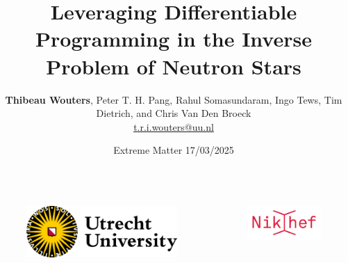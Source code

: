 \documentclass[usenames,dvipsnames,t]{beamer}
\title[\textsc{jester}] %
{Leveraging Differentiable Programming in the Inverse Problem of Neutron Stars}
\author[Thibeau Wouters]{\small{\textbf{Thibeau Wouters}, Peter T. H. Pang, Rahul Somasundaram, Ingo Tews, Tim Dietrich, and Chris Van Den Broeck} \\ \vspace{2mm} \href{mailto:t.r.i.wouters@uu.nl}{t.r.i.wouters@uu.nl} \newline \github \quad \linkedin \quad \twitter}
\date{Extreme Matter 17/03/2025}
\begin{document}
{


\begin{frame}[plain]
\titlepage

\begin{columns}
  \begin{figure}
    \centering
    \vspace{1.5mm}
    \includegraphics[width=0.75\linewidth]{Figures/utrecht-university.png}
  \end{figure}
  \begin{figure}
    \centering
    \includegraphics[width=0.75\linewidth]{Figures/Nikhef_logo-transparent.png}
  \end{figure}
\end{columns}



\end{frame}
}
\end{document}
